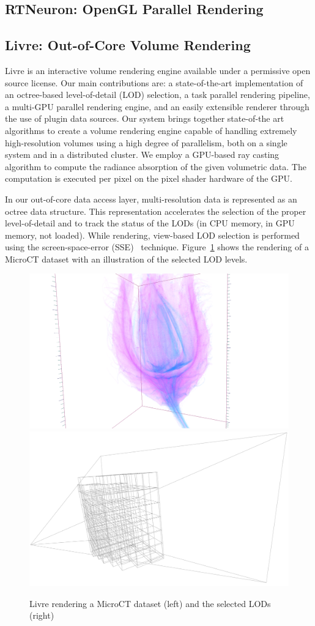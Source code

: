 \documentclass[10pt]{llncs}
\newcommand{\FIXME}[1]{\textbf{\color{BLUE}{FIXME: #1}}}
\newcommand{\fig}[1]{Figure~\ref{#1}}
\begin{document}
\FIXME{teaser gallery}

\subsection{RTNeuron: OpenGL Parallel Rendering}

\subsection{Livre: Out-of-Core Volume Rendering}

Livre is an interactive volume rendering engine available under a permissive
open source license. Our main contributions are: a state-of-the-art
implementation of an octree-based level-of-detail (LOD) selection, a task
parallel rendering pipeline, a multi-GPU parallel rendering engine, and an
easily extensible renderer through the use of plugin data sources. Our system
brings together state-of-the art algorithms to create a volume rendering engine
capable of handling extremely high-resolution volumes using a high degree of
parallelism, both on a single system and in a distributed cluster. We employ a
GPU-based ray casting algorithm to compute the radiance absorption of the given
volumetric data. The computation is executed per pixel on the pixel shader
hardware of the GPU.

In our out-of-core data access layer, multi-resolution data is represented as an
octree data structure. This representation accelerates the selection of the
proper level-of-detail and to track the status of the LODs (in CPU memory, in
GPU memory, not loaded). While rendering, view-based LOD selection is performed
using the screen-space-error (SSE)~\cite{guthe2004} technique. \fig{fLivre}
shows the rendering of a MicroCT dataset with an illustration of the selected
LOD levels.

\begin{figure}[h!t]
    \includegraphics[width=.45\columnwidth]{images/livre}\hfill
    \includegraphics[width=.45\columnwidth]{images/livreLOD}
  \caption{\label{fLivre}Livre rendering a MicroCT dataset (left) and
    the selected LODs (right)}
\end{figure}
\end{document}
